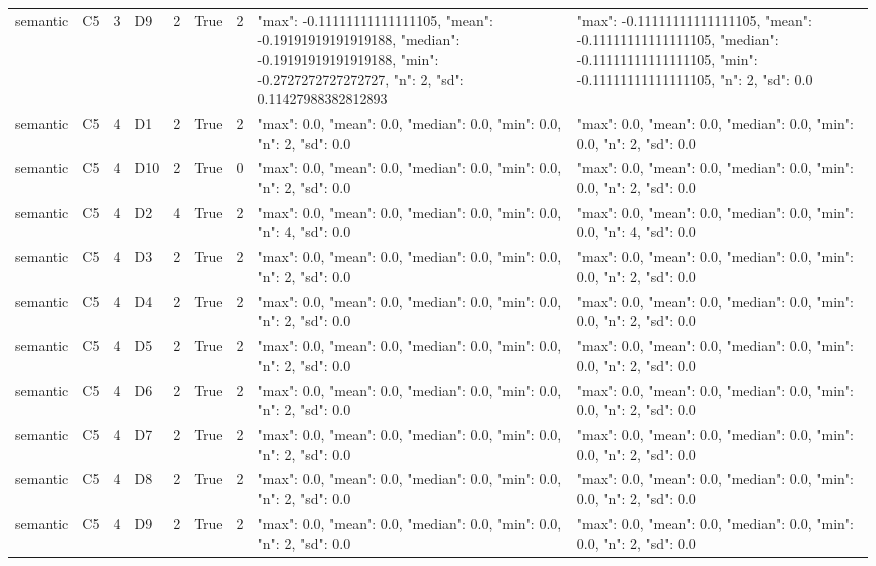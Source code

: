 \begin{tabular}{lllllllll}
semantic & C5 & 3 & D9 & 2 & True & 2 & {"max": -0.11111111111111105, "mean": -0.19191919191919188, "median": -0.19191919191919188, "min": -0.2727272727272727, "n": 2, "sd": 0.11427988382812893} & {"max": -0.11111111111111105, "mean": -0.11111111111111105, "median": -0.11111111111111105, "min": -0.11111111111111105, "n": 2, "sd": 0.0} \\
semantic & C5 & 4 & D1 & 2 & True & 2 & {"max": 0.0, "mean": 0.0, "median": 0.0, "min": 0.0, "n": 2, "sd": 0.0} & {"max": 0.0, "mean": 0.0, "median": 0.0, "min": 0.0, "n": 2, "sd": 0.0} \\
semantic & C5 & 4 & D10 & 2 & True & 0 & {"max": 0.0, "mean": 0.0, "median": 0.0, "min": 0.0, "n": 2, "sd": 0.0} & {"max": 0.0, "mean": 0.0, "median": 0.0, "min": 0.0, "n": 2, "sd": 0.0} \\
semantic & C5 & 4 & D2 & 4 & True & 2 & {"max": 0.0, "mean": 0.0, "median": 0.0, "min": 0.0, "n": 4, "sd": 0.0} & {"max": 0.0, "mean": 0.0, "median": 0.0, "min": 0.0, "n": 4, "sd": 0.0} \\
semantic & C5 & 4 & D3 & 2 & True & 2 & {"max": 0.0, "mean": 0.0, "median": 0.0, "min": 0.0, "n": 2, "sd": 0.0} & {"max": 0.0, "mean": 0.0, "median": 0.0, "min": 0.0, "n": 2, "sd": 0.0} \\
semantic & C5 & 4 & D4 & 2 & True & 2 & {"max": 0.0, "mean": 0.0, "median": 0.0, "min": 0.0, "n": 2, "sd": 0.0} & {"max": 0.0, "mean": 0.0, "median": 0.0, "min": 0.0, "n": 2, "sd": 0.0} \\
semantic & C5 & 4 & D5 & 2 & True & 2 & {"max": 0.0, "mean": 0.0, "median": 0.0, "min": 0.0, "n": 2, "sd": 0.0} & {"max": 0.0, "mean": 0.0, "median": 0.0, "min": 0.0, "n": 2, "sd": 0.0} \\
semantic & C5 & 4 & D6 & 2 & True & 2 & {"max": 0.0, "mean": 0.0, "median": 0.0, "min": 0.0, "n": 2, "sd": 0.0} & {"max": 0.0, "mean": 0.0, "median": 0.0, "min": 0.0, "n": 2, "sd": 0.0} \\
semantic & C5 & 4 & D7 & 2 & True & 2 & {"max": 0.0, "mean": 0.0, "median": 0.0, "min": 0.0, "n": 2, "sd": 0.0} & {"max": 0.0, "mean": 0.0, "median": 0.0, "min": 0.0, "n": 2, "sd": 0.0} \\
semantic & C5 & 4 & D8 & 2 & True & 2 & {"max": 0.0, "mean": 0.0, "median": 0.0, "min": 0.0, "n": 2, "sd": 0.0} & {"max": 0.0, "mean": 0.0, "median": 0.0, "min": 0.0, "n": 2, "sd": 0.0} \\
semantic & C5 & 4 & D9 & 2 & True & 2 & {"max": 0.0, "mean": 0.0, "median": 0.0, "min": 0.0, "n": 2, "sd": 0.0} & {"max": 0.0, "mean": 0.0, "median": 0.0, "min": 0.0, "n": 2, "sd": 0.0} \\

\end{tabular}
